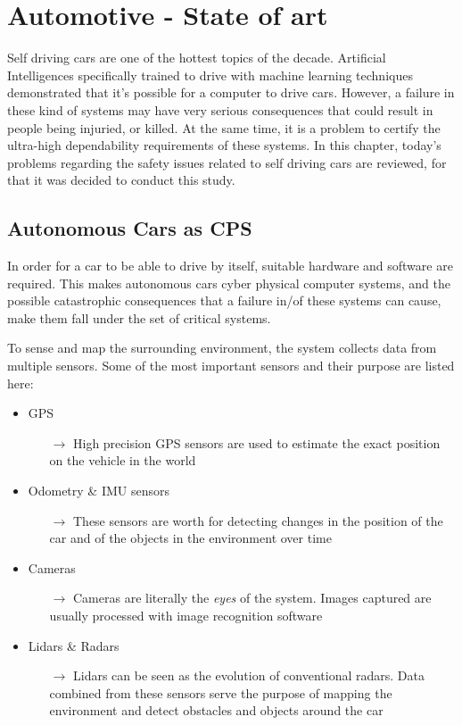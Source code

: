 \chapter{Automotive - State of art}

Self driving cars are one of the hottest topics of the decade. Artificial Intelligences specifically trained to drive with machine learning techniques demonstrated that it's possible for a computer to drive cars. However, a failure in these kind of systems may have very serious consequences that could result in people being injuried, or killed. At the same time, it is a problem to certify the ultra-high dependability requirements of these systems. In this chapter, today's problems regarding the safety issues related to self driving cars are reviewed, for that it was decided to conduct this study.

\section{Autonomous Cars as CPS}

In order for a car to be able to drive by itself, suitable hardware and software are required. This makes autonomous cars cyber physical computer systems, and the possible catastrophic consequences that a failure in/of these systems can cause, make them fall under the set of critical systems.\newline

To sense and map the surrounding environment, the system collects data from multiple sensors. Some of the most important sensors and their purpose are listed here:

\begin{itemize}
	\item GPS
	\begin{itemize}
		\item[$\rightarrow$] High precision GPS sensors are used to estimate the exact position on the vehicle in the world
	\end{itemize}
	\item Odometry \& IMU sensors
	\begin{itemize}
		\item[$\rightarrow$] These sensors are worth for detecting changes in the position of the car and of the objects in the environment over time
	\end{itemize}
	\item Cameras
	\begin{itemize}
		\item[$\rightarrow$] Cameras are literally the \textsl{eyes} of the system. Images captured are usually processed with image recognition software
	\end{itemize}
	\item Lidars \& Radars
	\begin{itemize}
		\item[$\rightarrow$] Lidars can be seen as the evolution of conventional radars. Data combined from these sensors serve the purpose of mapping the environment and detect obstacles and objects around the car
	\end{itemize}
\end{itemize}

